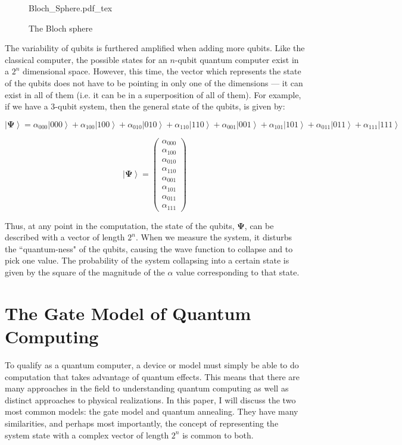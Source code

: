 \documentclass[11pt]{report}
\newcommand{\?}{\stackrel{?}{=}}
\begin{document}
\begin{figure}[!h]
    \centering
    \def\svgwidth{2in}
    {Bloch_Sphere.pdf_tex}
    \caption{The Bloch sphere}
    \label{fig:awesome_image}
\end{figure}

The variability of qubits is furthered amplified when adding more qubits. Like the classical computer, the possible states for an $n$-qubit quantum computer exist in a $2^{n}$ dimensional space. However, this time, the vector which represents the state of the qubits does not have to be pointing in only one of the dimensions --- it can exist in all of them (i.e. it can be in a superposition of all of them). For example, if we have a 3-qubit system, then the general state of the qubits, is given by:

$$ \left | \mathbf{\Psi} \right \rangle=\alpha _{000}\left | 000 \right \rangle+\alpha _{100}\left | 100 \right \rangle+\alpha _{010}\left | 010 \right \rangle+\alpha _{110}\left | 110 \right 
                \rangle+\alpha _{001}\left | 001 \right \rangle+\alpha _{101}\left | 101 \right \rangle+\alpha _{011}\left | 011 \right \rangle+\alpha _{111}\left | 111 
                \right \rangle$$
                
$$\left | \mathbf{\Psi} \right \rangle=\begin{pmatrix}\alpha_{000}\\\alpha _{100}\\\alpha_{010}\\\alpha_{110}\\\alpha_{001}\\\alpha_{101}\\\alpha_{011}\\\alpha_{111}\end{pmatrix}$$

	Thus, at any point in the computation, the state of the qubits, $\mathbf{\Psi}$, can be described with a vector of length $2^{n}$. When we measure the system, it disturbs the ``quantum-ness" of the qubits, causing the wave function to collapse and to pick one value. The probability of the system collapsing into a certain state is given by the square of the magnitude of the $\alpha$ value corresponding to that state.

\section{The Gate Model of Quantum Computing}
To qualify as a quantum computer, a device or model must simply be able to do computation that takes advantage of quantum effects. This means that there are many approaches in the field to understanding quantum computing as well as distinct approaches to physical realizations. In this paper, I will discuss the two most common models: the gate model and quantum annealing. They have many similarities, and perhaps most importantly, the concept of representing the system state with a complex vector of length $2^n$ is common to both. 
\end{document}
